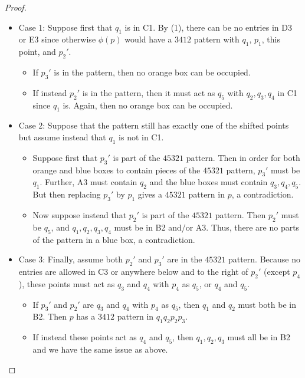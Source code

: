 \documentclass[11pt]{amsart}
\theoremstyle{remark}
\numberwithin{equation}{section}
\begin{document}
\begin{proof}
    \begin{itemize}
        \item Case 1: Suppose first that $q_1$ is in C1. By (1), there can be no entries in D3 or E3 since otherwise $\phi(p)$ would have a $3412$ pattern with $q_1$, $p_1$, this point, and $p_2'$.
        \begin{itemize}
            \item If $p_3'$ is in the pattern, then no orange box can be occupied. 
            \item If instead $p_2'$ is in the pattern, then it must act as $q_5$ with $q_2, q_3,q_4$ in C1 since $q_1$ is. Again, then no orange box can be occupied. 
        \end{itemize}
        \item Case 2: Suppose that the pattern still has exactly one of the shifted points but assume instead that $q_1$ is not in C1. 
        \begin{itemize}
            \item Suppose first that $p_3'$ is part of the $45321$ pattern. Then in order for both orange and blue boxes to contain pieces of the $45321$ pattern, $p_3'$ must be $q_1$. Further, A3 must contain $q_2$ and the blue boxes must contain $q_3,q_4,q_5$. But then replacing $p_3'$ by $p_1$ gives a $45321$ pattern in $p$, a contradiction.
            \item Now suppose instead that $p_2'$ is part of the $45321$ pattern. Then $p_2'$ must be $q_5$, and $q_1,q_2,q_3,q_4$ must be in B2 and/or A3. Thus, there are no parts of the pattern in a blue box, a contradiction. 
        \end{itemize}
        \item Case 3: Finally, assume both $p_2'$ and $p_3'$ are in the $45321$ pattern. Because no entries are allowed in C3 or anywhere below and to the right of $p_2'$ (except $p_4$), these points must act as $q_3$ and $q_4$ with $p_4$ as $q_5$, or $q_4$ and $q_5$.
        \begin{itemize}
            \item If $p_3'$ and $p_2'$ are $q_3$ and $q_4$ with $p_4$ as $q_5$, then $q_1$ and $q_2$ must both be in B2. Then $p$ has a $3412$ pattern in $q_1q_2p_2p_3$.
            \item If instead these points act as $q_4$ and $q_5$, then $q_1, q_2, q_3$ must all be in B2 and we have the same issue as above. 
        \end{itemize}
    \end{itemize}
    


\end{proof}
\end{document}
